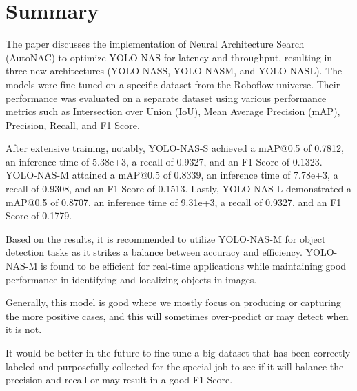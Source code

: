 \section{Summary}
The paper discusses the implementation of Neural Architecture Search (AutoNAC) to optimize YOLO-NAS for latency and throughput, resulting in three new architectures (YOLO-NASS, YOLO-NASM, and YOLO-NASL). The models were fine-tuned on a specific dataset from the Roboflow universe. Their performance was evaluated on a separate dataset using various performance metrics such as Intersection over Union (IoU), Mean Average Precision (mAP), Precision, Recall, and F1 Score.

After extensive training, notably, YOLO-NAS-S achieved a mAP@0.5 of 0.7812, an inference time of 5.38e+3, a recall of 0.9327, and an F1 Score of 0.1323. YOLO-NAS-M attained a mAP@0.5 of 0.8339, an inference time of 7.78e+3, a recall of 0.9308, and an F1 Score of 0.1513. Lastly, YOLO-NAS-L demonstrated a mAP@0.5 of 0.8707, an inference time of 9.31e+3, a recall of 0.9327, and an F1 Score of 0.1779.

Based on the results, it is recommended to utilize YOLO-NAS-M for object detection tasks as it strikes a balance between accuracy and efficiency. YOLO-NAS-M is found to be efficient for real-time applications while maintaining good performance in identifying and localizing objects in images.

Generally, this model is good where we mostly focus on producing or capturing the more positive cases, and this will sometimes over-predict or may detect when it is not. 

It would be better in the future to fine-tune a big dataset that has been correctly labeled and purposefully collected for the special job to see if it will balance the precision and recall or may result in a good F1 Score.